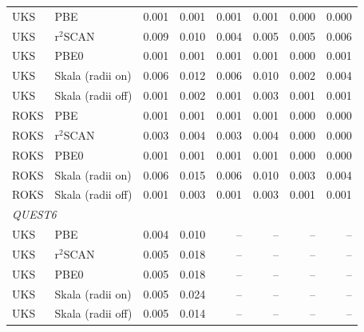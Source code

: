 \begin{table}[htbp]
\begin{tabular}{@{}llrrrrrr@{}}
UKS & PBE & 0.001 & 0.001 & 0.001 & 0.001 & 0.000 & 0.000 \\
UKS & r$^2$SCAN & 0.009 & 0.010 & 0.004 & 0.005 & 0.005 & 0.006 \\
UKS & PBE0 & 0.001 & 0.001 & 0.001 & 0.001 & 0.000 & 0.001 \\
UKS & Skala (radii on) & 0.006 & 0.012 & 0.006 & 0.010 & 0.002 & 0.004 \\
UKS & Skala (radii off) & 0.001 & 0.002 & 0.001 & 0.003 & 0.001 & 0.001 \\
\noalign{\smallskip}
ROKS & PBE & 0.001 & 0.001 & 0.001 & 0.001 & 0.000 & 0.000 \\
ROKS & r$^2$SCAN & 0.003 & 0.004 & 0.003 & 0.004 & 0.000 & 0.000 \\
ROKS & PBE0 & 0.001 & 0.001 & 0.001 & 0.001 & 0.000 & 0.000 \\
ROKS & Skala (radii on) & 0.006 & 0.015 & 0.006 & 0.010 & 0.003 & 0.004 \\
ROKS & Skala (radii off) & 0.001 & 0.003 & 0.001 & 0.003 & 0.001 & 0.001 \\
\hline
\multicolumn{8}{l}{\textit{QUEST6}} \\
UKS & PBE & 0.004 & 0.010 & -- & -- & -- & -- \\
UKS & r$^2$SCAN & 0.005 & 0.018 & -- & -- & -- & -- \\
UKS & PBE0 & 0.005 & 0.018 & -- & -- & -- & -- \\
UKS & Skala (radii on) & 0.005 & 0.024 & -- & -- & -- & -- \\
UKS & Skala (radii off) & 0.005 & 0.014 & -- & -- & -- & -- \\
\hline\hline
\end{tabular}
\end{table}
